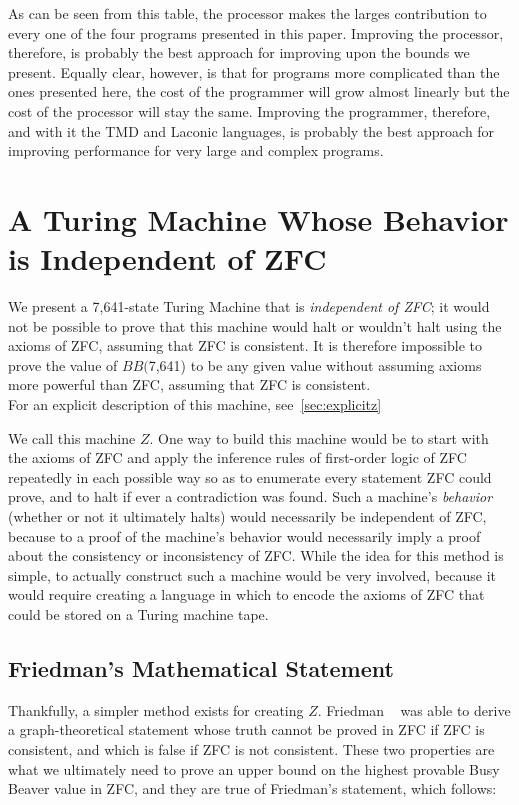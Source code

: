 \documentclass[11pt]{article}
\newcommand{\statenumstate}{7,641-state }
\newcommand{\bbstatenum}{$BB($7,641) }
\begin{document}
As can be seen from this table, the processor makes the larges contribution to every one of the four programs presented in this paper. Improving the processor, therefore, is probably the best approach for improving upon the bounds we present. Equally clear, however, is that for programs more complicated than the ones presented here, the cost of the programmer will grow almost linearly but the cost of the processor will stay the same. Improving the programmer, therefore, and with it the TMD and Laconic languages, is probably the best approach for improving performance for very large and complex programs.

\section{A Turing Machine Whose Behavior is Independent of ZFC}

We present a \statenumstate Turing Machine that is \emph{independent of ZFC}; it would not be possible to prove that this machine would halt or wouldn't halt using the axioms of ZFC, assuming that ZFC is consistent. It is therefore impossible to prove the value of \bbstatenum to be any given value without assuming axioms more powerful than ZFC, assuming that ZFC is consistent. \\

For an explicit description of this machine, see~\ref{sec:explicitz}

We call this machine $Z$. One way to build this machine would be to start with the axioms of ZFC and apply the inference rules of first-order logic of ZFC repeatedly in each possible way so as to enumerate every statement ZFC could prove, and to halt if ever a contradiction was found. Such a machine's \emph{behavior} (whether or not it ultimately halts) would necessarily be independent of ZFC, because to a proof of the machine's behavior would necessarily imply a proof about the consistency or inconsistency of ZFC. While the idea for this method is simple, to actually construct such a machine would be very involved, because it would require creating a language in which to encode the axioms of ZFC that could be stored on a Turing machine tape. \\

\subsection{Friedman's Mathematical Statement}

Thankfully, a simpler method exists for creating $Z$. Friedman \cite{friedman}~
was able to derive a graph-theoretical statement whose truth cannot be proved in ZFC if ZFC is consistent, and which is false if ZFC is not consistent. These two properties are what we ultimately need to prove an upper bound on the highest provable Busy Beaver value in ZFC, and they are true of Friedman's statement, which follows: \\
\end{document}
